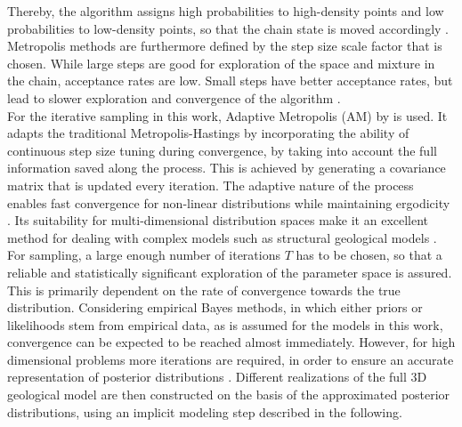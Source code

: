         Thereby, the algorithm assigns high probabilities to high-density points and low probabilities to low-density points, so that the chain state is moved accordingly \citep{delaVarga2016}.\\
        Metropolis methods are furthermore defined by the step size scale factor that is chosen. While large steps are good for exploration of the space and mixture in the chain, acceptance rates are low. Small steps have better acceptance rates, but lead to slower exploration and convergence of the algorithm \citep{delaVarga2016}.\\
        For the iterative sampling in this work, Adaptive Metropolis (AM) by \citet{haario2001adaptive} is used. It adapts the traditional Metropolis-Hastings by incorporating the ability of continuous step size tuning during convergence, by taking into account the full information saved along the process. This is achieved by generating a covariance matrix that is updated every iteration. The adaptive nature of the process enables fast convergence for non-linear distributions while maintaining ergodicity \citep{haario2001adaptive, delaVarga2016}. Its suitability for multi-dimensional distribution spaces make it an excellent method for dealing with complex models such as structural geological models \citep{schaaf2017}.\\
        For sampling, a large enough number of iterations $T$ has to be chosen, so that a reliable and statistically significant exploration of the parameter space is assured. This is primarily dependent on the rate of convergence towards the true distribution. Considering empirical Bayes methods, in which either priors or likelihoods stem from empirical data, as is assumed for the models in this work, convergence can be expected to be reached almost immediately. However, for high dimensional problems more iterations are required, in order to ensure an accurate representation of posterior distributions \citep{wellmann2017sandstone}. Different realizations of the full 3D geological model are then constructed on the basis of the approximated posterior distributions, using an implicit modeling step described in the following.
        
